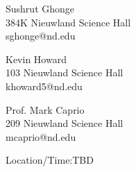 \documentclass[12pt]{mcplain}
\begin{document}


\begin{multicols}{3}

Sushrut Ghonge\\
384K Nieuwland Science Hall\\
sghonge@nd.edu

\columnbreak
Kevin Howard\\
103 Nieuwland Science Hall\\
khoward5@nd.edu

\columnbreak

Prof. Mark Caprio\\
209 Nieuwland Science Hall\\
mcaprio@nd.edu
\end{multicols}


\syllabusseparator


\begin{leftindent}
 Location/Time:TBD %
\end{leftindent}


%
%
%
\end{document}
